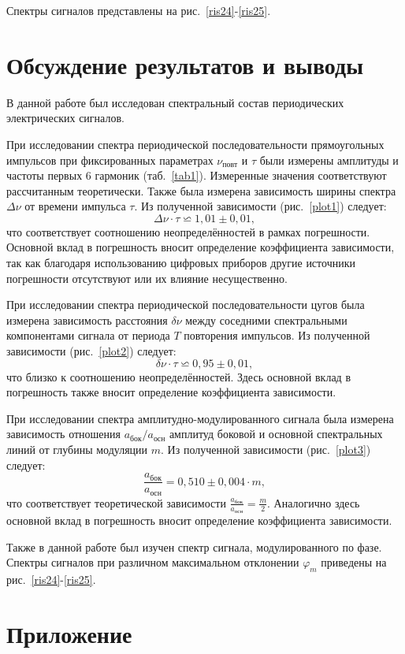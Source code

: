\documentclass[a4paper, 12pt]{article}
\begin{document}
Спектры сигналов представлены на рис.~\ref{ris24}-\ref{ris25}.

\section{Обсуждение результатов и выводы}

В данной работе был исследован спектральный состав периодических электрических сигналов.

При исследовании спектра периодической последовательности прямоугольных импульсов при фиксированных параметрах $\nu_{повт}$ и $\tau$ были измерены амплитуды и частоты первых 6 гармоник (таб.~\ref{tab1}). Измеренные значения соответствуют рассчитанным теоретически. Также была измерена зависимость ширины спектра $\Delta{\nu}$ от времени импульса $\tau$. Из полученной зависимости (рис.~\ref{plot1}) следует: $$\Delta{\nu} \cdot \tau \backsimeq 1,01\pm0,01,$$ что соответствует соотношению неопределённостей в рамках погрешности. Основной вклад в погрешность вносит определение коэффициента зависимости, так как благодаря использованию цифровых приборов другие источники погрешности отсутствуют или их влияние несущественно.

При исследовании спектра периодической последовательности цугов была измерена зависимость расстояния $\delta{\nu}$ между соседними спектральными компонентами сигнала от периода $T$ повторения импульсов. Из полученной зависимости (рис.~\ref{plot2}) следует: $$\delta{\nu} \cdot \tau \backsimeq 0,95\pm0,01,$$ что близко к соотношению неопределённостей. Здесь основной вклад в погрешность также вносит определение коэффициента зависимости.

При исследовании спектра амплитудно-модулированного сигнала была измерена зависимость отношения $a_{бок}/a_{осн}$ амплитуд боковой и основной спектральных линий от глубины модуляции $m$. Из полученной зависимости (рис.~\ref{plot3}) следует: $$\frac{a_{бок}}{a_{осн}} = 0,510\pm0,004 \cdot m,$$ что соответствует теоретической зависимости $\frac{a_{бок}}{a_{осн}} = \frac{m}{2}$. Аналогично здесь основной вклад в погрешность вносит определение коэффициента зависимости.

Также в данной работе был изучен спектр сигнала, модулированного по фазе. Спектры сигналов при различном максимальном отклонении $\varphi_m$ приведены на рис.~\ref{ris24}-\ref{ris25}.

\section{Приложение}
\end{document}
